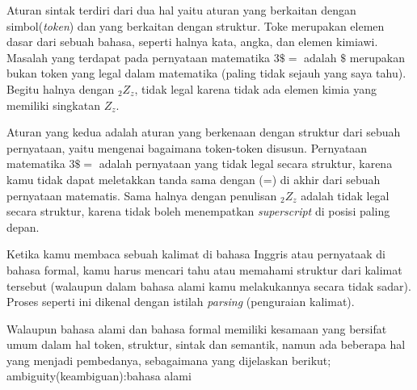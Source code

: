 Aturan sintak terdiri dari dua hal yaitu aturan yang berkaitan dengan simbol(\textit{token}) dan yang berkaitan dengan struktur. Toke merupakan elemen dasar dari sebuah bahasa, seperti halnya kata, angka, dan elemen kimiawi. Masalah yang terdapat pada pernyataan matematika $ 3\$=$ adalah $ \$ $ merupakan bukan token yang legal dalam matematika (paling tidak sejauh yang saya tahu). Begitu halnya dengan $_{2}Z_{z}$, tidak legal karena tidak ada elemen kimia yang memiliki singkatan $ Z_{z} $.

Aturan yang kedua adalah aturan yang berkenaan dengan struktur dari sebuah pernyataan, yaitu mengenai bagaimana token-token disusun. Pernyataan matematika $ 3\$=$ adalah pernyataan yang tidak legal secara struktur, karena kamu tidak dapat meletakkan tanda sama dengan (=) di akhir dari sebuah pernyataan matematis. Sama halnya dengan penulisan $_{2}Z_{z}$ adalah tidak legal secara struktur, karena tidak boleh menempatkan \textit{superscript} di posisi paling depan.

Ketika kamu membaca sebuah kalimat di bahasa Inggris atau pernyataak di bahasa formal, kamu harus mencari tahu atau memahami struktur dari kalimat tersebut (walaupun dalam bahasa alami kamu melakukannya secara tidak sadar). Proses seperti ini dikenal dengan istilah \textit{parsing} (penguraian kalimat).

Walaupun bahasa alami dan bahasa formal memiliki kesamaan yang bersifat umum dalam hal token, struktur, sintak dan semantik, namun ada beberapa hal yang menjadi pembedanya, sebagaimana yang dijelaskan berikut;
ambiguity(keambiguan):bahasa alami 


